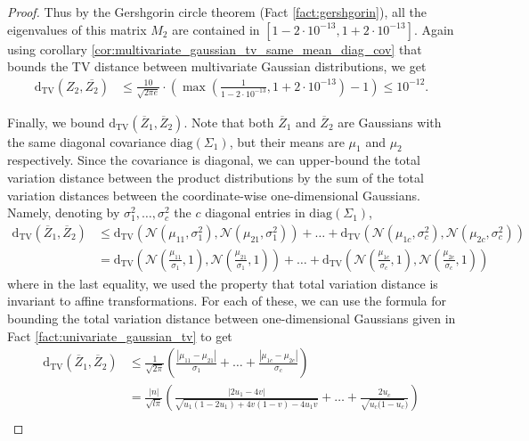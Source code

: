 \documentclass[10pt]{article} %
\theoremstyle{plain}
\newcommand{\dtv}{\mathrm{d_{TV}}}
\newcommand{\diag}{\mathrm{diag}}
\begin{document}
\begin{proof}
    
    
	Thus by the Gershgorin circle theorem (Fact \ref{fact:gershgorin}), all the eigenvalues of this matrix $M_2$ are contained in $[1-2 \cdot 10^{-13}, 1+2 \cdot 10^{-13}]$. Again using corollary \ref{cor:multivariate_gaussian_tv_same_mean_diag_cov} that bounds the TV distance between multivariate Gaussian distributions, we get
	\begin{align*}
		\dtv(Z_2, \overline{Z_2}) &\le \frac{10}{\sqrt{2\pi e}}\cdot \left(\max\left(\frac{1}{1-2 \cdot 10^{-13}}, 1+2 \cdot 10^{-13}\right)-1\right) \le 10^{-12}.
	\end{align*}
	
	
	Finally, we bound $\dtv(\overline{Z}_1, \overline{Z}_2)$. Note that both $\overline{Z}_1$ and $\overline{Z}_2$ are Gaussians with the same diagonal covariance $\diag(\Sigma_1)$, but their means are $\mu_1$ and $\mu_2$ respectively. Since the covariance is diagonal, we can upper-bound the total variation distance between the product distributions by the sum of the total variation distances between the coordinate-wise one-dimensional Gaussians. Namely, denoting by $\sigma^2_1, \dots, \sigma^2_c$ the $c$ diagonal entries in $\diag(\Sigma_1)$,
	\begin{align*}
		\dtv(\overline{Z}_1, \overline{Z}_2) &\le \dtv(\mathcal{N}(\mu_{11}, \sigma^2_{1}), \mathcal{N}(\mu_{21}, \sigma^2_{1})) + \dots + \dtv(\mathcal{N}(\mu_{1c}, \sigma^2_{c}), \mathcal{N}(\mu_{2c}, \sigma^2_{c})) \\
		&= \dtv\left(\mathcal{N}\left(\frac{\mu_{11}}{\sigma_1}, 1\right), \mathcal{N}\left(\frac{\mu_{21}}{\sigma_1}, 1\right)\right) + \dots + \dtv\left(\mathcal{N}\left(\frac{\mu_{1c}}{\sigma_c}, 1\right), \mathcal{N}\left(\frac{\mu_{2c}}{\sigma_c}, 1\right)\right) %
	\end{align*}
	where in the last equality, we used the property that total variation distance is invariant to affine transformations.
	For each of these, we can use the formula for bounding the total variation distance between one-dimensional Gaussians given in  Fact \ref{fact:univariate_gaussian_tv} to get
	\begin{align*}
		\dtv(\overline{Z}_1, \overline{Z}_2) &\le \frac{1}{\sqrt{2\pi}} \left(\frac{|\mu_{11}-\mu_{21}|}{\sigma_1} + \dots + \frac{|\mu_{1c}-\mu_{2c}|}{\sigma_c} %
		\right) \\
		&= \frac{|n|}{\sqrt{l\pi}}\left(\frac{|2u_1-4v|}{\sqrt{u_1(1-2u_1)+4v(1-v) - 4u_1v}} + \dots + \frac{2u_c}{\sqrt{u_c(1-u_c})} %
		\right) \\

\end{align*}
\end{proof}
\end{document}
